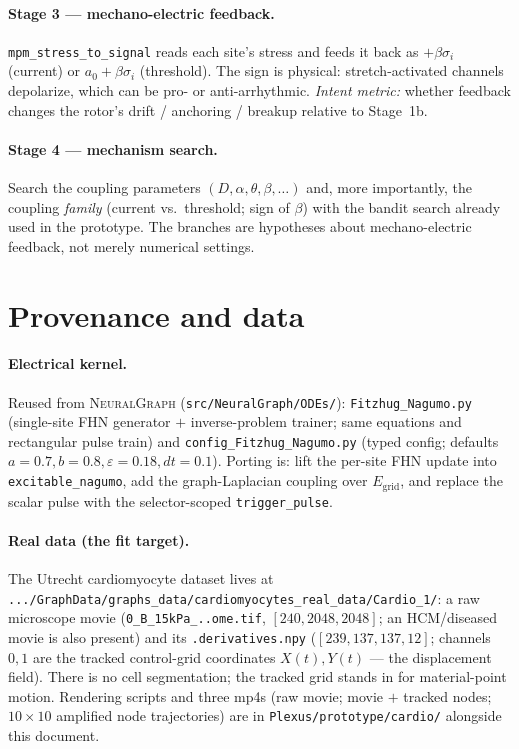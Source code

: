 \documentclass[11pt]{article}
\newcommand{\code}[1]{\texttt{#1}}
\begin{document}
\paragraph{Stage 3 --- mechano-electric feedback.}
\code{mpm\_stress\_to\_signal} reads each site's stress and feeds it back as
$+\beta\sigma_i$ (current) or $a_0+\beta\sigma_i$ (threshold). The sign is physical:
stretch-activated channels depolarize, which can be pro- or anti-arrhythmic.
\emph{Intent metric:} whether feedback changes the rotor's drift / anchoring /
breakup relative to Stage~1b.

\paragraph{Stage 4 --- mechanism search.}
Search the coupling parameters $(D,\alpha,\theta,\beta,\dots)$ and, more importantly,
the coupling \emph{family} (current vs.\ threshold; sign of $\beta$) with the bandit
search already used in the prototype. The branches are hypotheses about
mechano-electric feedback, not merely numerical settings.

\section{Provenance and data}

\paragraph{Electrical kernel.} Reused from \textsc{NeuralGraph}
(\code{src/NeuralGraph/ODEs/}): \code{Fitzhug\_Nagumo.py} (single-site FHN generator
$+$ inverse-problem trainer; same equations and rectangular pulse train) and
\code{config\_Fitzhug\_Nagumo.py} (typed config; defaults $a{=}0.7,b{=}0.8,
\varepsilon{=}0.18,dt{=}0.1$). Porting is: lift the per-site FHN update into
\code{excitable\_nagumo}, add the graph-Laplacian coupling over $E_{\mathrm{grid}}$,
and replace the scalar pulse with the selector-scoped \code{trigger\_pulse}.

\paragraph{Real data (the fit target).} The Utrecht cardiomyocyte dataset lives at
\code{.../GraphData/graphs\_data/cardiomyocytes\_real\_data/Cardio\_1/}: a raw
microscope movie (\code{0\_B\_15kPa\_..ome.tif}, $[240,2048,2048]$; an HCM/diseased
movie is also present) and its \code{.derivatives.npy} ($[239,137,137,12]$; channels
$0,1$ are the tracked control-grid coordinates $X(t),Y(t)$ --- the displacement
field). There is no cell segmentation; the tracked grid stands in for material-point
motion. Rendering scripts and three mp4s (raw movie; movie $+$ tracked nodes;
$10\times10$ amplified node trajectories) are in
\code{Plexus/prototype/cardio/} alongside this document.
\end{document}
